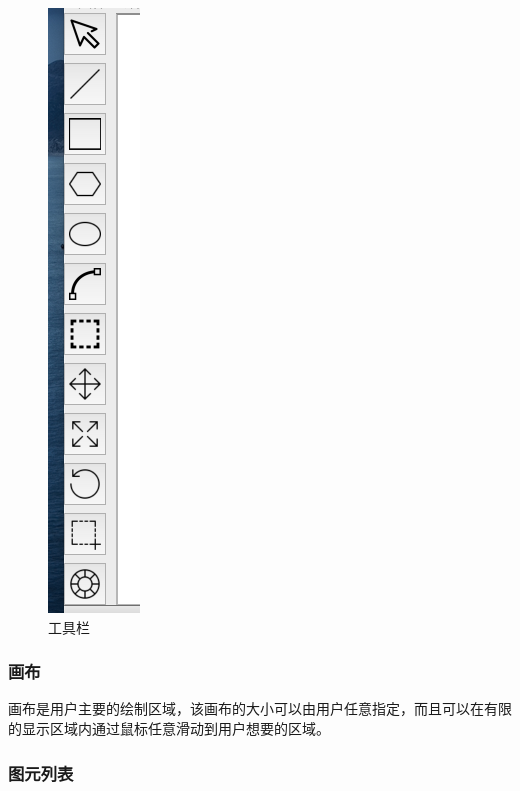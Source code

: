 \documentclass[11pt, a4paper, UTF8]{ctexart}
\begin{document}
\begin{figure}[H]
    \centering
    \includegraphics[scale=0.5]{toolbar.png}
    \caption{工具栏}
\end{figure}

\subsubsection{画布}

画布是用户主要的绘制区域，该画布的大小可以由用户任意指定，而且可以在有限的显示区域内通过鼠标任意滑动到用户想要的区域。

\subsubsection{图元列表}
\end{document}
